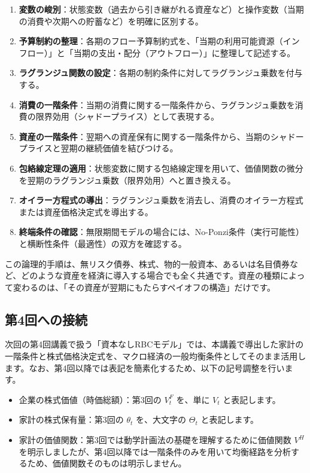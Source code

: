 \documentclass[
  japanese,
  lualatex,
  ja=standard,
  12pt,
  a4paper]{ltjsarticle}
\providecommand{\tightlist}{%
  \setlength{\itemsep}{0pt}\setlength{\parskip}{0pt}}
\begin{document}
\begin{enumerate}
\def\labelenumi{\arabic{enumi}.}
\tightlist
\item
  \textbf{変数の峻別}：状態変数（過去から引き継がれる資産など）と操作変数（当期の消費や次期への貯蓄など）を明確に区別する。
\item
  \textbf{予算制約の整理}：各期のフロー予算制約式を、「当期の利用可能資源（インフロー）」と「当期の支出・配分（アウトフロー）」に整理して記述する。
\item
  \textbf{ラグランジュ関数の設定}：各期の制約条件に対してラグランジュ乗数を付与する。
\item
  \textbf{消費の一階条件}：当期の消費に関する一階条件から、ラグランジュ乗数を消費の限界効用（シャドープライス）として表現する。
\item
  \textbf{資産の一階条件}：翌期への資産保有に関する一階条件から、当期のシャドープライスと翌期の継続価値を結びつける。
\item
  \textbf{包絡線定理の適用}：状態変数に関する包絡線定理を用いて、価値関数の微分を翌期のラグランジュ乗数（限界効用）へと置き換える。
\item
  \textbf{オイラー方程式の導出}：ラグランジュ乗数を消去し、消費のオイラー方程式または資産価格決定式を導出する。
\item
  \textbf{終端条件の確認}：無限期間モデルの場合には、No-Ponzi条件（実行可能性）と横断性条件（最適性）の双方を確認する。
\end{enumerate}

この論理的手順は、無リスク債券、株式、物的一般資本、あるいは名目債券など、どのような資産を経済に導入する場合でも全く共通です。資産の種類によって変わるのは、「その資産が翌期にもたらすペイオフの構造」だけです。

\subsection{第4回への接続}\label{ux7b2c4ux56deux3078ux306eux63a5ux7d9a}

次回の第4回講義で扱う「資本なしRBCモデル」では、本講義で導出した家計の一階条件と株式価格決定式を、マクロ経済の一般均衡条件としてそのまま活用します。なお、第4回以降では表記を簡素化するため、以下の記号調整を行います。

\begin{itemize}
\tightlist
\item
  企業の株式価値（時価総額）：第3回の \(V_t^F\) を、単に \(V_t\)
  と表記します。
\item
  家計の株式保有量：第3回の \(\theta_t\) を、大文字の \(\Theta_t\)
  と表記します。
\item
  家計の価値関数：第3回では動学計画法の基礎を理解するために価値関数
  \(V^H\)
  を明示しましたが、第4回以降では一階条件のみを用いて均衡経路を分析するため、価値関数そのものは明示しません。
\end{itemize}
\end{document}
